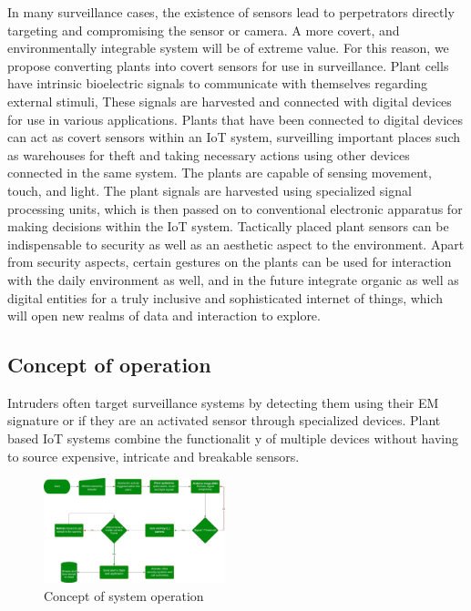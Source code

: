 \documentclass[conference]{IEEEtran}
\begin{document}
    In many surveillance cases, the existence of sensors lead to perpetrators
    directly targeting and compromising the sensor or camera. A more covert,
    and environmentally integrable system will be of extreme value. For this
    reason, we propose converting plants into covert sensors for use in 
    surveillance. Plant cells have intrinsic bioelectric signals to 
    communicate with themselves regarding external stimuli, These signals are
    harvested and connected with digital devices for use in various 
    applications. Plants that have been connected to digital devices can act
    as covert sensors within an IoT system, surveilling important places such
    as warehouses for theft and taking necessary actions using other devices
    connected in the same system. The plants are capable of sensing 
    movement, touch, and light. The plant signals are harvested using
    specialized signal processing units, which is then passed on to 
    conventional electronic apparatus for making decisions within the
    IoT system. Tactically placed plant sensors can be indispensable to
    security as well as an aesthetic aspect to the environment. Apart from 
    security aspects, certain gestures on the plants can be used for 
    interaction with the daily environment as well, and in the future
    integrate organic as well as digital entities for a truly inclusive and
    sophisticated internet of things, which will open new realms of data and
    interaction to explore.

    \subsection{Concept of operation}
    Intruders often target surveillance systems by detecting them using 
    their EM signature or if they are an activated sensor through 
    specialized devices. Plant based IoT systems combine the functionalit
    y of multiple devices without having to source expensive, intricate and breakable sensors.

    \begin{figure}[H]
        \begin{center}
            \includegraphics[width=0.47\textwidth]{flowchart}
        \end{center}
        \caption{Concept of system operation}\label{fig:}
    \end{figure}
    
\end{document}

